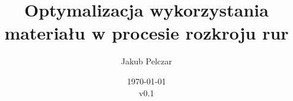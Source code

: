 \documentclass[11pt,a4paper]{article}
\title{Optymalizacja wykorzystania materiału w procesie rozkroju rur}
\author{Jakub Pelczar}
\date{\today\\v0.1}
\begin{document}
\maketitle
\tableofcontents



\nocite{GilmoreGomoryV1Article}
\nocite{GilmoreGomoryV2Article}
\nocite{ChvatalBook}
\nocite{GauArticle}
\nocite{DyckhoffLPArticle}
\nocite{DyckhoffTyArticle}
\nocite{CerqueiraArticle}
\nocite{GoulimisArticle}
\nocite{HaesslerArticle}
\nocite{WojdaLecture}



\end{document}
